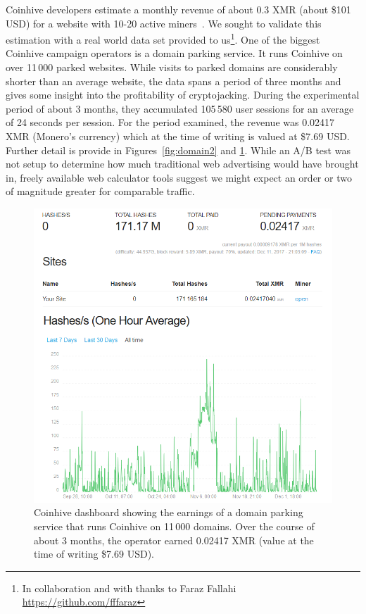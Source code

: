 Coinhive developers estimate a monthly revenue of about 0.3 XMR (about \$101 USD) for a website with 10-20 active miners~\cite{coinhive}. We sought to validate this estimation with a real world data set provided to us\footnote{In collaboration and with thanks to Faraz Fallahi \url{https://github.com/fffaraz}}. One of the biggest Coinhive campaign operators is a domain parking service. It runs Coinhive on over 11\,000 parked websites. While visits to parked domains are considerably shorter than an average website, the data spans a period of three months and gives some insight into the profitability of cryptojacking. During the experimental period of about 3 months, they accumulated 105\,580 user sessions for an average of 24 seconds per session. For the period examined, the revenue was 0.02417 XMR (Monero's currency) which at the time of writing is valued at \$7.69 USD. Further detail is provide in Figures~\ref{fig:domain2} and \ref{fig:domain1}. While an A/B test was not setup to determine how much traditional web advertising would have brought in, freely available web calculator tools suggest we might expect an order or two of magnitude greater for comparable traffic. 

\begin{figure}[t]
\centering
\includegraphics[width=0.8\linewidth]{figures/experiment_coinhive_results.png}
\caption[Coinhive Earnings Dashboard]{Coinhive dashboard showing the earnings of a domain parking service that runs Coinhive on 11\,000 domains. Over the course of about 3 months, the operator earned 0.02417 XMR (value at the time of writing \$7.69 USD).}\label{fig:domain1}
\end{figure}


